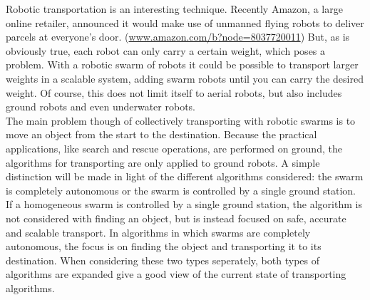 
Robotic transportation is an interesting technique. 
Recently Amazon, a large online retailer, announced it would make use of unmanned flying robots to deliver parcels at everyone's door. (\url{www.amazon.com/b?node=8037720011})
But, as is obviously true, each robot can only carry a certain weight, which poses a problem. 
With a robotic swarm of robots it could be possible to transport larger weights in a scalable system, adding swarm robots until you can carry the desired weight. 
Of course, this does not limit itself to aerial robots, but also includes ground robots and even underwater robots. \\
The main problem though of collectively transporting with robotic swarms is to move an object from the start to the destination.
Because the practical applications, like search and rescue operations, are performed on ground, the algorithms for transporting are only applied to ground robots. 
A simple distinction will be made in light of the different algorithms considered: the swarm is completely autonomous or the swarm is controlled by a single ground station.
If a homogeneous swarm is controlled by a single ground station, the algorithm is not considered with finding an object, but is instead focused on safe, accurate and scalable transport. 
In algorithms in which swarms are completely autonomous, the focus is on finding the object and transporting it to its destination.
When considering these two types seperately, both types of algorithms are expanded give a good view of the current state of transporting algorithms.  \\

